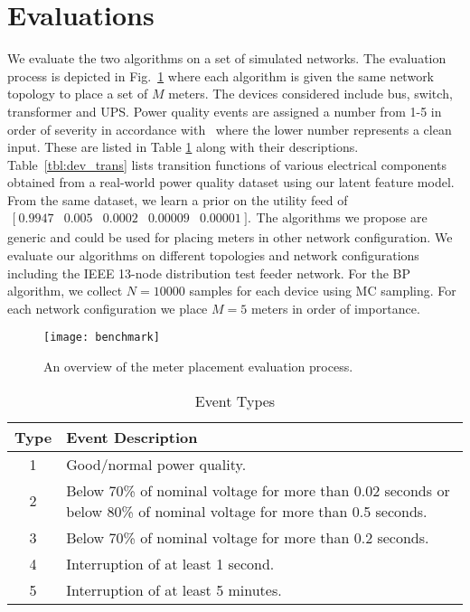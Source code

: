 \section{Evaluations}
\label{sec:experiments}
We evaluate the two algorithms on a set of simulated networks. The evaluation process is depicted in Fig.~\ref{fig:benchmark} where each algorithm is given the same network topology to place a set of $M$ meters. The devices considered include bus, switch, transformer and UPS. Power quality events are assigned a number from 1-5 in order of severity in accordance with~\cite{epri2002} where the lower number represents a clean input. These are listed in Table \ref{EventDescriptions} along with their descriptions. Table~\ref{tbl:dev_trans} lists transition functions of various electrical components obtained from a real-world power quality dataset using our latent feature model. From the same dataset, we learn a prior on the utility feed of $\begin{array}{ccccc}[\ 0.9947 & 0.005 & 0.0002 & 0.00009 & 0.00001\ ].\end{array}$The algorithms we propose are generic and could be used for placing meters in other network configuration. We evaluate our algorithms on different topologies and network configurations including the IEEE 13-node distribution test feeder network. For the BP algorithm, we collect $N=10000$ samples for each device using MC sampling. For each network configuration we place $M=5$ meters in order of importance.

\begin{figure}[!t]
\centering
\texttt{[image: benchmark]}
\caption{An overview of the meter placement evaluation process. }
\label{fig:benchmark}
\end{figure}

\begin{table}[!t]
\centering
\small
\caption{Event Types}
\label{EventDescriptions}
{\renewcommand{\arraystretch}{1.0}
\begin{tabular}{|c|p{}|}
\hline 
Type  & Event Description\tabularnewline
\hline 
1  & Good/normal power quality.\tabularnewline
2  & Below 70\% of nominal voltage for more than 0.02 seconds or below 80\% of nominal voltage for more than 0.5 seconds.\tabularnewline
3  & Below 70\% of nominal voltage for more than 0.2 seconds.\tabularnewline
4  & Interruption of at least 1 second.\tabularnewline
5  & Interruption of at least 5 minutes.\tabularnewline
\hline 
\end{tabular}}
\end{table}

